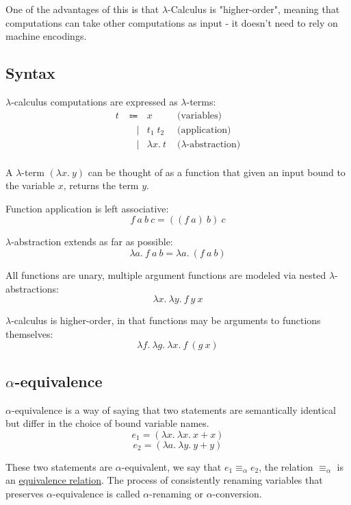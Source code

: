 \documentclass{article}
\begin{document}
One of the advantages of this is that $\lambda$-Calculus is "higher-order", meaning that computations can take other computations as input - it doesn't need to rely on machine encodings.

\subsection{Syntax}\label{lambda-term}
$\lambda$-calculus computations are expressed as $\lambda$-terms:
\begin{equation}
\begin{aligned}
    t \; & \Coloneqq & x & \text{    (variables)} \nonumber \\
       &\;\;\:|& t_1 \; t_2 & \text{    (application)} \nonumber \\
       &\;\;\:|& \lambda x.\:t & \text{    ($\lambda$-abstraction)} \nonumber \\
\end{aligned}
\end{equation}

A $\lambda$-term $(\lambda x.\:y)$ can be thought of as a function that given an input bound to the variable $x$, returns the term $y$.

Function application is left associative:
\[f\:a\:b\:c = ((f\:a)\:b)\:c\]

$\lambda$-abstraction extends as far as possible:
\[\lambda a.\:f\:a\:b = \lambda a.\:(f\:a\:b)\]

All functions are unary, multiple argument functions are modeled via nested $\lambda$-abstractions:
\[\lambda x.\:\lambda y.\:f\:y\:x\]

$\lambda$-calculus is higher-order, in that functions may be arguments to functions themselves:
\[\lambda f.\:\lambda g.\:\lambda x.\:f\:(g\:x)\]

\subsection{$\alpha$-equivalence}\label{alpha-equivalence}\label{alpha-rename}
$\alpha$-equivalence is a way of saying that two statements are semantically identical but differ in the choice of bound variable names.
\[e_1 = (\lambda x.\:\lambda x.\:x + x)\]
\[e_2 = (\lambda a.\:\lambda y.\:y + y)\]

These two statements are $\alpha$-equivalent, we say that $e_1 \equiv_\alpha e_2$, the relation $\equiv_\alpha$ is an \hyperref[equivalence-relation]{equivalence relation}. The process of consistently renaming variables that preserves $\alpha$-equivalence is called $\alpha$-renaming or $\alpha$-conversion.
\end{document}
